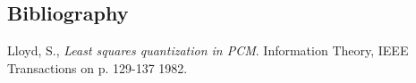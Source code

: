 \documentclass[12pt]{article}
\begin{document}
\begin{multicols}{2}
\section{Bibliography}
\begin{thebibliography}{9}

  Lloyd, S.,
  \emph{Least squares quantization in PCM}.
  Information Theory, IEEE Transactions on
  p. 129-137
  1982.

\end{thebibliography}
\end{multicols}

\newpage 
\begin{table}[htbp]
  \centering{}\caption {Best, worst and overall performance of cluster factorization.}\label{clustersFact}
\end{table}%
\end{document}
